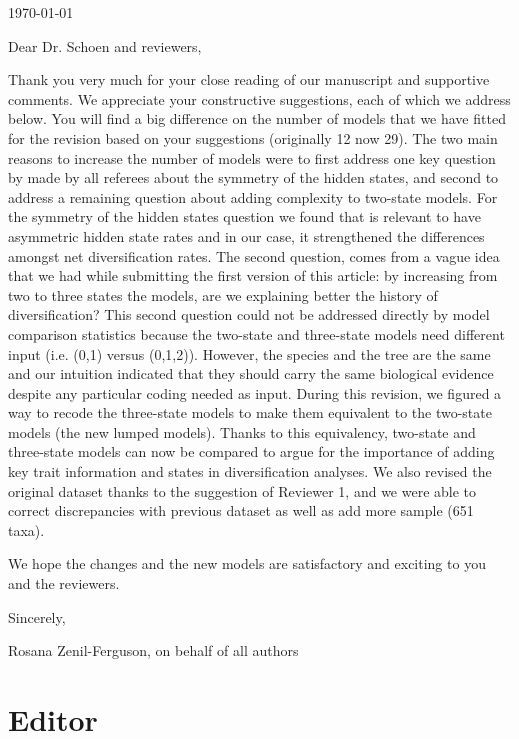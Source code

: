 \documentclass[11pt]{article}
\begin{document}
\hfill \today

Dear Dr. Schoen and reviewers,

\medskip
Thank you very much for your close reading of our manuscript and supportive comments. We appreciate your constructive suggestions, each of which we address below. You will find a big difference on the number of  models  that we have fitted for the revision based on your suggestions (originally 12 now 29). The two main reasons to increase the number of models were to first address one key question by made by all referees about the symmetry of the hidden states, and second to address a remaining question about adding complexity to two-state models. For the symmetry of the hidden states  question we found that is relevant to have asymmetric hidden state rates and in our case, it strengthened the differences amongst net diversification rates. The second question,  comes from a vague idea that we had while submitting the first version of this article: by increasing from two to three states the models, are we explaining better the history of diversification? This second question could not be addressed directly by model comparison statistics because the two-state and three-state models need different input (i.e. (0,1) versus (0,1,2)). However, the species and the tree are the same and our intuition indicated that they should carry the same biological evidence despite any particular coding needed as input. During this revision, we figured a way to recode the three-state models to make them equivalent to the two-state models (the new lumped models). Thanks to this equivalency, two-state and three-state models can now be compared to argue for the importance of adding key trait information and states in diversification analyses. We also revised the original dataset thanks to the suggestion of Reviewer 1, and we were able to correct discrepancies with previous dataset as well as add more sample (651 taxa).

We hope the changes and the new models are satisfactory and exciting to you and the reviewers.

\medskip
Sincerely,

Rosana Zenil-Ferguson, on behalf of all authors


\section{Editor}
\vspace{-11pt}
\end{document}
